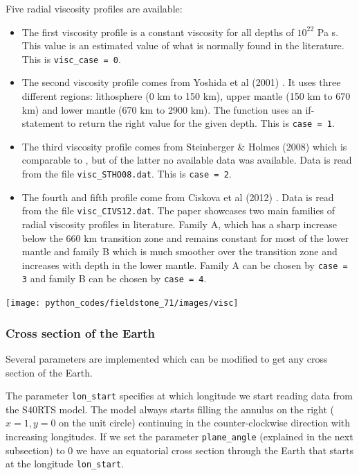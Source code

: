 Five radial viscosity profiles are available:
\begin{itemize}
\item The first viscosity profile is a constant viscosity for all depths of $10^{22}$ Pa s. 
This value is an estimated value of what is normally found in the literature. This is \texttt{visc\_case = 0}. 

\item The second viscosity profile comes from Yoshida et al (2001) \cite{yohk01}. It uses three different regions: lithosphere (0 km to 150 km), upper mantle (150 km to 670 km) and lower mantle (670 km to 2900 km). The function uses an if-statement to return the right value for the given depth. This is \texttt{case = 1}.

\item The third viscosity profile comes from Steinberger \& Holmes (2008) \cite{stho08} 
which is comparable to \cite{stca06}, but of the latter no available data was available. 
Data is read from the file \texttt{visc\_STHO08.dat}. 
This is \texttt{case = 2}.

\item The fourth and fifth profile come from Ciskova et al (2012) \cite{civs12}. 
Data is read from the file \texttt{visc\_CIVS12.dat}. 
The paper showcases two main families of radial viscosity profiles in literature. Family A, which has a sharp 
increase below the 660 km transition zone and remains constant for most of the lower mantle 
and family B which is much smoother over the transition zone and increases with depth in the lower mantle. 
Family A can be chosen by \texttt{case = 3} and family B can be chosen by \texttt{case = 4}.

\end{itemize}

\begin{center}
\texttt{[image: python\_codes/fieldstone\_71/images/visc]}
\end{center}


\subsubsection*{Cross section of the Earth}

Several parameters are implemented which can be modified to get any cross section of the Earth. 

The parameter \texttt{lon\_start} specifies at which longitude we start reading data from the S40RTS model. The model always starts filling the annulus on the right ($x=1, y=0$ on the unit circle) continuing in the counter-clockwise direction with increasing longitudes. If we set the parameter \texttt{plane\_angle} (explained in the next subsection) to 0 we have an equatorial cross section through the Earth that starts at the longitude \texttt{lon\_start}.

